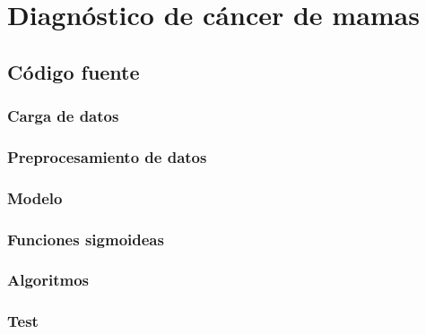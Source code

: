 \section{Diagnóstico de cáncer de mamas}


\subsection{Código fuente}

\subsubsection*{Carga de datos}



\subsubsection*{Preprocesamiento de datos}



\subsubsection*{Modelo}



\subsubsection*{Funciones sigmoideas}



\subsubsection*{Algoritmos}



\subsubsection*{Test}


